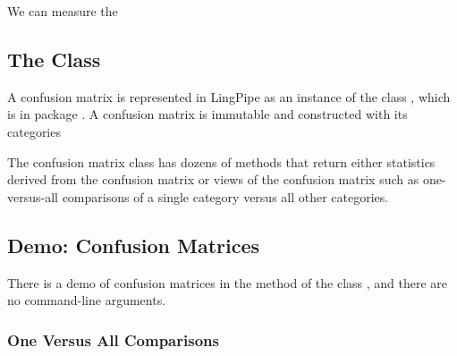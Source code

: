 We can measure the 


\subsection{The  Class}

A confusion matrix is represented in LingPipe as an instance of the
class , which is in package
.  A confusion matrix is immutable and
constructed with its categories


The confusion matrix class has dozens of methods that return either
statistics derived from the confusion matrix or views of the confusion
matrix such as one-versus-all comparisons of a single category versus
all other categories.




\subsection{Demo: Confusion Matrices}

There is a demo of confusion matrices in the  method of
the class , and there are no command-line
arguments.
%
%



\subsubsection{One Versus All Comparisons}



